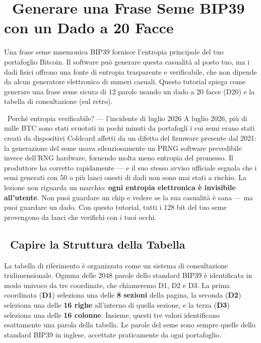 \documentclass[10pt]{article}
\begin{document}
\section*{\faBitcoin~Generare una Frase Seme BIP39 con un Dado a 20 Facce}

\footnotesize

Una frase seme mnemonica BIP39 fornisce l'entropia principale del tuo portafoglio Bitcoin. Il software può generare questa casualità al posto tuo, ma i dadi fisici offrono una fonte di entropia trasparente e verificabile, che non dipende da alcun generatore elettronico di numeri casuali. Questo tutorial spiega come generare una frase seme sicura di 12 parole usando un dado a 20 facce (D20) e la tabella di consultazione (sul retro).

\begin{contextbox}{\faNewspaper~Perché entropia verificabile? --- l'incidente di luglio 2026}
A luglio 2026, più di mille BTC sono stati svuotati in pochi minuti da portafogli i cui semi erano stati creati da dispositivi Coldcard affetti da un difetto del firmware presente dal 2021: la generazione del seme usava silenziosamente un PRNG software prevedibile invece dell'RNG hardware, fornendo molta meno entropia del promesso. Il produttore ha corretto rapidamente --- e il suo stesso avviso ufficiale segnala che i semi generati con 50 o più lanci onesti di dadi non sono mai stati a rischio. La lezione non riguarda un marchio: \textbf{ogni entropia elettronica è invisibile all'utente}. Non puoi guardare un chip e vedere se la sua casualità è sana --- ma puoi guardare un dado. Con questo tutorial, tutti i 128 bit del tuo seme provengono da lanci che verifichi con i tuoi occhi.
\end{contextbox}

\subsection*{\faTable~Capire la Struttura della Tabella}

La tabella di riferimento è organizzata come un sistema di consultazione tridimensionale. Ognuna delle 2048 parole dello standard BIP39 è identificata in modo univoco da tre coordinate, che chiameremo D1, D2 e D3. La prima coordinata (\textbf{D1}) seleziona una delle \textbf{8 sezioni} della pagina, la seconda (\textbf{D2}) seleziona una delle \textbf{16 righe} all'interno di quella sezione, e la terza (\textbf{D3}) seleziona una delle \textbf{16 colonne}. Insieme, questi tre valori identificano esattamente una parola della tabella. Le parole del seme sono sempre quelle dello standard BIP39 in inglese, accettate praticamente da ogni portafoglio.
\end{document}
